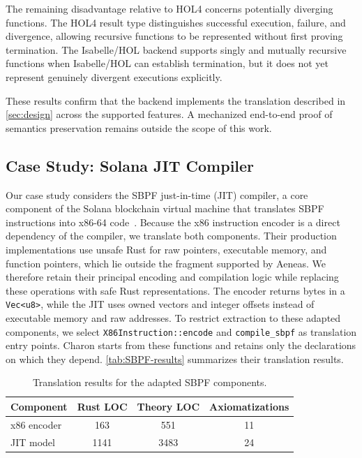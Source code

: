 The remaining disadvantage relative to HOL4 concerns potentially diverging functions.
The HOL4 result type distinguishes successful execution, failure, and divergence, allowing recursive functions to be represented without first proving termination.
The Isabelle/HOL backend supports singly and mutually recursive functions when Isabelle/HOL can establish termination, but it does not yet represent genuinely divergent executions explicitly.

These results confirm that the backend implements the translation described in \autoref{sec:design} across the supported features.
A mechanized end-to-end proof of semantics preservation remains outside the scope of this work.



\subsection{Case Study: Solana JIT Compiler}
\label{sec:SBPF-case-study}

Our case study considers the SBPF just-in-time (JIT) compiler, a core component of the Solana blockchain virtual machine that translates SBPF instructions into x86-64 code~\cite{anza2026SBPF}.
Because the x86 instruction encoder is a direct dependency of the compiler, we translate both components.
Their production implementations use unsafe Rust for raw pointers, executable memory, and function pointers, which lie outside the fragment supported by Aeneas.
We therefore retain their principal encoding and compilation logic while replacing these operations with safe Rust representations.
The encoder returns bytes in a \texttt{Vec<u8>}, while the JIT uses owned vectors and integer offsets instead of executable memory and raw addresses.
To restrict extraction to these adapted components, we select \texttt{X86Instruction::encode} and \texttt{compile\_sbpf} as translation entry points.
Charon starts from these functions and retains only the declarations on which they depend.
\autoref{tab:SBPF-results} summarizes their translation results.

\begin{table}[!ht]
  \centering
  \caption{Translation results for the adapted SBPF components.}
  \label{tab:SBPF-results}
  \small
  \renewcommand{\arraystretch}{1.1}
  \begin{tabular*}{0.92\linewidth}
    {@{\extracolsep{\fill}}lccc@{}}
    \toprule
    \textbf{Component} &
    \multicolumn{1}{c}{\textbf{Rust LOC}} &
    \multicolumn{1}{c}{\textbf{Theory LOC}} &
    \multicolumn{1}{c}{\textbf{Axiomatizations}} \\
    \midrule
    x86 encoder & 163  & 551  & 11 \\
    JIT model   & 1141 & 3483 & 24 \\
    \bottomrule
  \end{tabular*}
\end{table}

